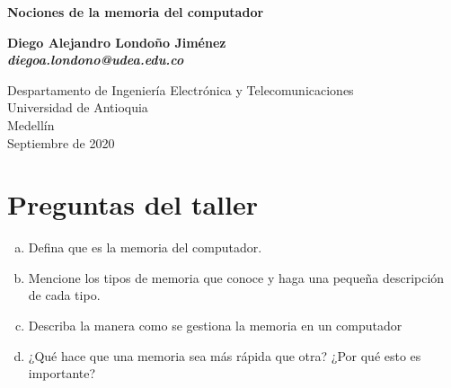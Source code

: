 \documentclass[12pt,letterpaper]{article}
\begin{document}

\begin{titlepage}
    \begin{center}
        \vspace*{1cm}
            
        \Huge
        \textbf{Nociones de la memoria del computador}
            
        \vspace{0.5cm}
        \LARGE
            
        \vspace{1.5cm}
            
        \textbf{Diego Alejandro Londoño Jiménez\\ \emph{diegoa.londono@udea.edu.co} }
            
        \vfill
            
        \vspace{0.8cm}
            
        \Large
        Despartamento de Ingeniería Electrónica y Telecomunicaciones\\
        Universidad de Antioquia\\
        Medellín\\
        Septiembre de 2020\\
        
            
    \end{center}
\end{titlepage}



\tableofcontents



\newpage

\section{Preguntas del taller}\label{preguntas}
    \begin{enumerate}[a)]
    \item Defina que es la memoria del computador.
    \item Mencione los tipos de memoria que conoce y haga una pequeña descripción de cada tipo.
    \item Describa la manera como se gestiona la memoria en un computador
    \item ¿Qué hace que una memoria sea más rápida que otra? ¿Por qué esto es importante?
    \end{enumerate}
\end{document}
